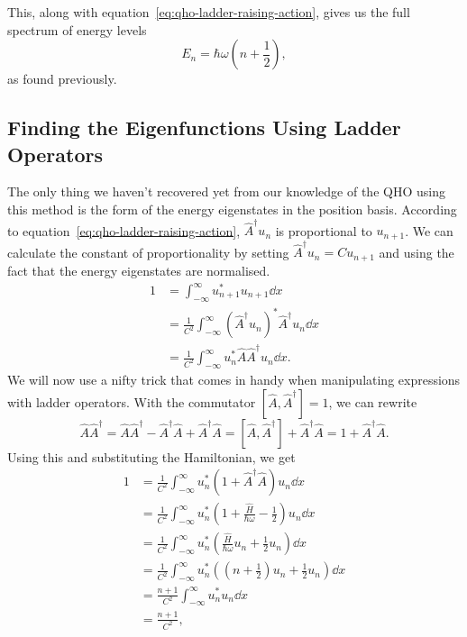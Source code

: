 \documentclass[../quantum_mechanics.tex]{subfiles}
\begin{document}
            This, along with equation~\ref{eq:qho-ladder-raising-action}, gives us the full spectrum of energy levels
            \begin{equation}
                E_n=\hbar\omega\left(n+\frac{1}{2}\right),
            \end{equation}
            as found previously.

        \subsection{Finding the Eigenfunctions Using Ladder Operators}\label{subsec:finding-the-eigenfunctions-using-ladder-operators}
            The only thing we haven't recovered yet from our knowledge of the QHO using this method is the form of the energy eigenstates in the position basis.
            According to equation~\ref{eq:qho-ladder-raising-action}, $\hat{A}^\dagger u_n$ is proportional to $u_{n+1}$.
            We can calculate the constant of proportionality by setting $\hat{A}^\dagger u_n=Cu_{n+1}$ and using the fact that the energy eigenstates are normalised.
            \begin{align}
                1&=\int_{-\infty}^\infty u_{n+1}^\ast u_{n+1}\dd{x}\\
                &=\frac{1}{C^2}\int_{-\infty}^\infty(\hat{A}^\dagger u_n)^\ast\hat{A}^\dagger u_n\dd{x}\\
                &=\frac{1}{C^2}\int_{-\infty}^\infty u_n^\ast\hat{A}\hat{A}^\dagger u_n\dd{x}.
            \end{align}
            We will now use a nifty trick that comes in handy when manipulating expressions with ladder operators.
            With the commutator $[\hat{A},\hat{A}^\dagger]=1$, we can rewrite
            \begin{equation}
                \hat{A}\hat{A}^\dagger=\hat{A}\hat{A}^\dagger-\hat{A}^\dagger\hat{A}+\hat{A}^\dagger\hat{A}=[\hat{A},\hat{A}^\dagger]+\hat{A}^\dagger\hat{A}=1+\hat{A}^\dagger\hat{A}.
            \end{equation}
            Using this and substituting the Hamiltonian, we get
            \begin{align}
                1&=\frac{1}{C^2}\int_{-\infty}^\infty u_n^\ast(1+\hat{A}^\dagger\hat{A})u_n\dd{x}\\
                &=\frac{1}{C^2}\int_{-\infty}^\infty u_n^\ast\left(1+\frac{\hat{H}}{\hbar\omega}-\frac{1}{2}\right)u_n\dd{x}\\
                &=\frac{1}{C^2}\int_{-\infty}^\infty u_n^\ast\left(\frac{\hat{H}}{\hbar\omega}u_n+\frac{1}{2}u_n\right)\dd{x}\\
                &=\frac{1}{C^2}\int_{-\infty}^\infty u_n^\ast\left(\left(n+\frac{1}{2}\right)u_n+\frac{1}{2}u_n\right)\dd{x}\\
                &=\frac{n+1}{C^2}\int_{-\infty}^\infty u_n^\ast u_n\dd{x}\\
                &=\frac{n+1}{C^2},
            \end{align}
\end{document}
